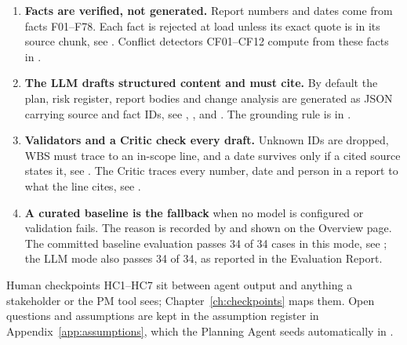 \begin{enumerate}[leftmargin=*,itemsep=2pt]
  \item \textbf{Facts are verified, not generated.} Report numbers and dates come from facts F01--F78. Each fact is rejected at load unless its exact quote is in its source chunk, see . Conflict detectors CF01--CF12 compute from these facts in .
  \item \textbf{The LLM drafts structured content and must cite.} By default the plan, risk register, report bodies and change analysis are generated as JSON carrying source and fact IDs, see , ,  and . The grounding rule is in .
  \item \textbf{Validators and a Critic check every draft.} Unknown IDs are dropped, WBS must trace to an in-scope line, and a date survives only if a cited source states it, see . The Critic traces every number, date and person in a report to what the line cites, see .
  \item \textbf{A curated baseline is the fallback} when no model is configured or validation fails. The reason is recorded by  and shown on the Overview page. The committed baseline evaluation passes 34 of 34 cases in this mode, see ; the LLM mode also passes 34 of 34, as reported in the Evaluation Report.
\end{enumerate}

Human checkpoints HC1--HC7 sit between agent output and anything a stakeholder or the PM tool sees; Chapter~\ref{ch:checkpoints} maps them. Open questions and assumptions are kept in the assumption register in Appendix~\ref{app:assumptions}, which the Planning Agent seeds automatically in .
